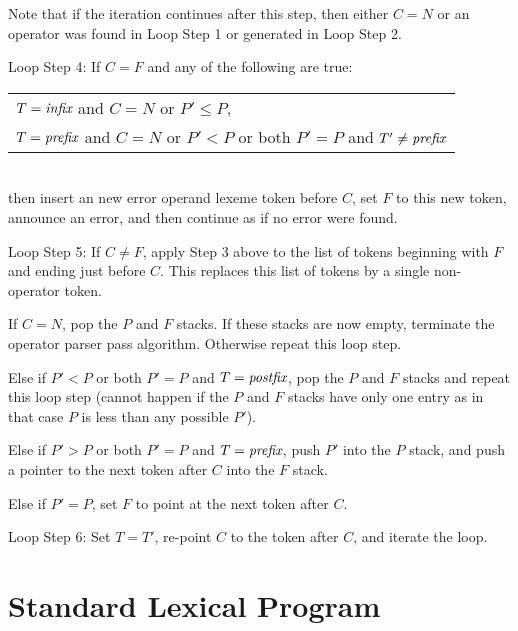 \documentclass[12pt]{article}
\newenvironment{itemlist}[1][1.2in]%
	{\begin{list}{}{\setlength{\labelwidth}{#1}%
		        \setlength{\leftmargin}{\labelwidth}%
		        \addtolength{\leftmargin}{+0.2in}%
		        \renewcommand{\makelabel}[1]{##1\hfill}}}%
	{\end{list}}
\begin{document}
\begin{itemlist}[1.2in]
Note that if the iteration continues after this step,
then either $C=N$ or an operator was found in Loop Step 1
or generated in Loop Step 2.
\item[Loop Step 4:]
If $C=F$ and any of the following are true:
\\[1ex]
\hspace*{0.2in}
\begin{tabular}{@{}l@{}}
$T=\mbox{\em infix}$ and $C=N$ or $P'\leq P$, \\
$T=\mbox{\em prefix}$ and $C=N$ or $P'<P$
    or both $P'=P$ and $T'\not=\mbox{\em prefix}$
\end{tabular}
\\[1ex]
then insert
an new error operand lexeme token before $C$,
set $F$ to this new token,
announce an error, and then continue as if no error were found.
\item[Loop Step 5:]
If $C\not=F$,
apply Step 3 above to the list of tokens beginning with
$F$ and ending just before $C$.  This replaces this list of tokens
by a single non-operator token.

If $C=N$, pop the $P$ and $F$ stacks.  If these stacks are now
empty, terminate the operator parser pass algorithm.  Otherwise
repeat this loop step.

Else if $P'<P$ or both $P'=P$ and $T=\mbox{\em postfix}$,
pop the $P$ and $F$ stacks and repeat this loop step
(cannot happen if the $P$ and $F$ stacks have only one entry as
in that case $P$ is less than any possible $P'$).

Else if $P'>P$ or both $P'=P$ and $T=\mbox{\em prefix}$,
push $P'$ into the $P$ stack, and push a pointer to the
next token after $C$ into the $F$ stack.

Else if $P'=P$, set $F$ to point at the next token after $C$.

\item[Loop Step 6:]
Set $T=T'$,
re-point $C$ to the token after $C$, and iterate the loop.
\end{itemlist}

\clearpage

\appendix

\section{Standard Lexical Program}
\label{STANDARD-LEXICAL-PROGRAM}
\end{document}
